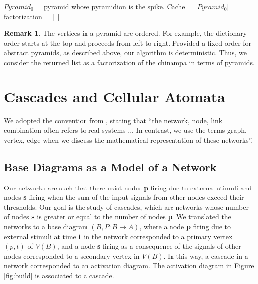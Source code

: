 \documentclass[a4paper]{article}\usepackage[english]{babel}
\theoremstyle{definition}
\newtheorem{remark}[theorem]{Remark}
\renewcommand{\emph}[1]{\textbf{#1}}
\begin{document}
\begin{algorithm}[H]
\SetAlgoLined
\caption{Factorization via BFS.}
$Pyramid_0$ = pyramid whose pyramidion is the spike.\;
Cache = [$Pyramid_0$]\; factorization = [~]\;
\label{alg:vertical-stakes}
\end{algorithm}

\begin{remark}\label{rmk:det}
The vertices in a pyramid are ordered. For example, the dictionary order starts at the top and proceeds from left to right. Provided a fixed order for abstract pyramids, as described above, our algorithm is deterministic. Thus, we consider the returned list as a factorization of the chinampa in terms of pyramids.
\end{remark}

\section{Cascades and Cellular Atomata}\label{sec:cascades-cellular}

We adopted the convention from \cite{network}, stating that ``the network, node, link combination often refers to real systems ... In contrast, we use the terms graph, vertex, edge when we discuss the mathematical representation of these networks''. 

\subsection{Base Diagrams as a Model of a Network}

Our networks are such that there exist nodes \emph{p} firing due to external stimuli and nodes \emph{s} firing when the sum of the input signals from other nodes exceed their thresholds. Our goal is the study of cascades, which are networks whose number of nodes \emph{s} is greater or equal to the number of nodes \emph{p}. We translated the networks to a base diagram $(B, P:B\mapsto A)$, where a node \emph{p} firing due to external stimuli  at time \emph{t} in the network corresponded to a primary vertex $(p,t)$ of $V(B)$, and a node \emph{s} firing as a consequence of the signals of other nodes corresponded to a secondary vertex in $V(B)$. In this way, a cascade in a network corresponded to an activation diagram. The activation diagram in Figure \ref{fig:build} is associated to a cascade. 
\end{document}
